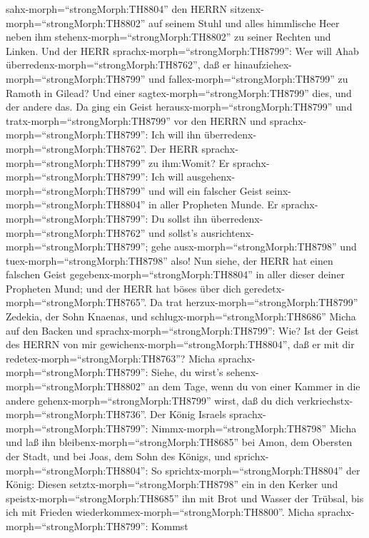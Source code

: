 sahx-morph=``strongMorph:TH8804'' den HERRN
sitzenx-morph=``strongMorph:TH8802'' auf seinem Stuhl und alles
himmlische Heer neben ihm stehenx-morph=``strongMorph:TH8802'' zu seiner
Rechten und Linken.  Und der HERR
sprachx-morph=``strongMorph:TH8799'': Wer will Ahab
überredenx-morph=``strongMorph:TH8762'', daß er
hinaufziehex-morph=``strongMorph:TH8799'' und
fallex-morph=``strongMorph:TH8799'' zu Ramoth in Gilead? Und einer
sagtex-morph=``strongMorph:TH8799'' dies, und der andere das.
 Da ging ein Geist herausx-morph=``strongMorph:TH8799'' und
tratx-morph=``strongMorph:TH8799'' vor den HERRN und
sprachx-morph=``strongMorph:TH8799'': Ich will ihn
überredenx-morph=``strongMorph:TH8762''. Der HERR
sprachx-morph=``strongMorph:TH8799'' zu ihm:Womit?  Er
sprachx-morph=``strongMorph:TH8799'': Ich will
ausgehenx-morph=``strongMorph:TH8799'' und will ein falscher Geist
seinx-morph=``strongMorph:TH8804'' in aller Propheten Munde. Er
sprachx-morph=``strongMorph:TH8799'': Du sollst ihn
überredenx-morph=``strongMorph:TH8762'' und sollst's
ausrichtenx-morph=``strongMorph:TH8799''; gehe
ausx-morph=``strongMorph:TH8798'' und tuex-morph=``strongMorph:TH8798''
also!  Nun siehe, der HERR hat einen falschen Geist
gegebenx-morph=``strongMorph:TH8804'' in aller dieser deiner Propheten
Mund; und der HERR hat böses über dich
geredetx-morph=``strongMorph:TH8765''.  Da trat
herzux-morph=``strongMorph:TH8799'' Zedekia, der Sohn Knaenas, und
schlugx-morph=``strongMorph:TH8686'' Micha auf den Backen und
sprachx-morph=``strongMorph:TH8799'': Wie? Ist der Geist des HERRN von
mir gewichenx-morph=``strongMorph:TH8804'', daß er mit dir
redetex-morph=``strongMorph:TH8763''?  Micha
sprachx-morph=``strongMorph:TH8799'': Siehe, du wirst's
sehenx-morph=``strongMorph:TH8802'' an dem Tage, wenn du von einer
Kammer in die andere gehenx-morph=``strongMorph:TH8799'' wirst, daß du
dich verkriechstx-morph=``strongMorph:TH8736''.  Der König
Israels sprachx-morph=``strongMorph:TH8799'':
Nimmx-morph=``strongMorph:TH8798'' Micha und laß ihn
bleibenx-morph=``strongMorph:TH8685'' bei Amon, dem Obersten der Stadt,
und bei Joas, dem Sohn des Königs,  und
sprichx-morph=``strongMorph:TH8804'': So
sprichtx-morph=``strongMorph:TH8804'' der König: Diesen
setztx-morph=``strongMorph:TH8798'' ein in den Kerker und
speistx-morph=``strongMorph:TH8685'' ihn mit Brot und Wasser der
Trübsal, bis ich mit Frieden wiederkommex-morph=``strongMorph:TH8800''.
 Micha sprachx-morph=``strongMorph:TH8799'': Kommst
